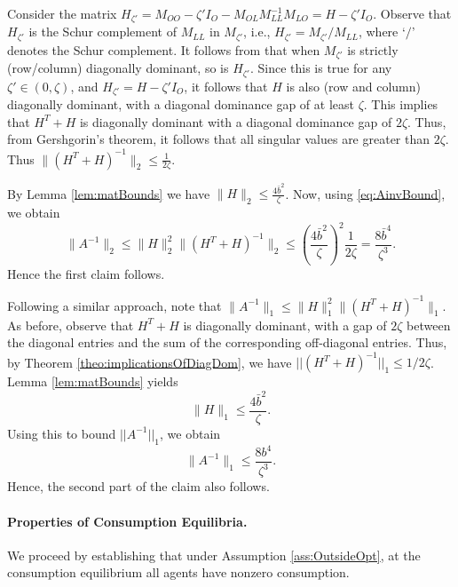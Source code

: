 \documentclass[opre,nonblindrev]{informs3} %
\begin{document}
\begin{APPENDIX}{}
Consider the matrix $H_{\zeta'}=M_{OO}-{\zeta'}I_O-M_{OL} M_{LL}^{-1} M_{LO}=H-{\zeta'}I_O$.
Observe that $H_{\zeta'}$ is the Schur complement of $M_{LL}$ in $M_{\zeta'}$, i.e., $H_{\zeta'}= M_{\zeta'}/M_{LL}$, where `$/$' denotes the Schur complement.
It follows from \cite{lei2003schur} that when $M_{\zeta'}$ is strictly (row/column) diagonally dominant, so is
$H_{\zeta'}$.
Since this is true
for any ${\zeta'}\in(0,\zeta)$, and
$H_{\zeta'}=H-{\zeta'}I_O$,
it follows that $H$ is also (row and column) diagonally dominant, with a diagonal dominance gap of at least $\zeta$.
This implies that
$H^{T}+H$ is diagonally dominant with a diagonal dominance gap of $2\zeta$. Thus, from Gershgorin's theorem, it follows that all singular values are greater than $2\zeta$. Thus
$\|(H^{T}+H)^{-1}\|_2\leq \frac{1}{2\zeta}$.


By Lemma \ref{lem:matBounds} we  have
$\|H\|_2 \leq \frac{4\bar{b}^2}{\zeta}$.	
Now, using \eqref{eq:AinvBound}, we obtain
\[\|A^{-1}\|_2
\leq \|H\|_2^2  \|(H^{T}+H)^{-1}\|_2
\leq
\left(\frac{4\bar{b}^2}{\zeta}\right)^2 \frac{1}{2\zeta}=
\frac{8\bar{b}^4}{\zeta^3}.
\]
Hence the first claim follows.

Following a similar approach, note that
$\|A^{-1}\|_1 \leq \|H\|^2_1  \|(H^{T}+H)^{-1}\|_1
$.
As before, observe that $H^{T}+H$ is diagonally dominant, with a gap of $2\zeta$ between the diagonal entries and the sum of the corresponding off-diagonal entries. Thus, by Theorem \ref{theo:implicationsOfDiagDom}, we have
$||(H^{T}+H)^{-1}||_1\leq 1/2\zeta$.
Lemma \ref{lem:matBounds} yields
\[
\|H\|_1 \leq \frac{4\bar{b}^2}{\zeta}.
\]
Using this to bound $||A^{-1}||_1$, we obtain
\[
\|A^{-1}\|_1 \leq \frac{8b^4}{\zeta^3} .
\]
Hence, the second part of the claim also follows.
\hfill \halmos
\endproof

\paragraph{Properties of Consumption Equilibria.}
 	We proceed by establishing that under Assumption \ref{ass:OutsideOpt}, at the consumption equilibrium all agents have nonzero consumption.
 	

\end{APPENDIX}
\end{document}
